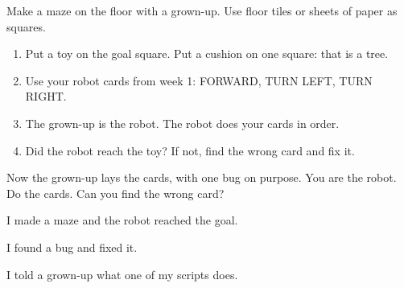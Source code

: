 
\begin{playathome}
Make a maze on the floor with a grown-up. Use floor tiles or sheets of paper as squares.
\begin{enumerate}[leftmargin=1.4em,itemsep=2pt]
  \item Put a toy on the goal square. Put a cushion on one square: that is a tree.
  \item Use your robot cards from week 1: FORWARD, TURN LEFT, TURN RIGHT.
  \item The grown-up is the robot. The robot does your cards in order.
  \item Did the robot reach the toy? If not, find the wrong card and fix it.
\end{enumerate}
\end{playathome}

\begin{playathome}
Now the grown-up lays the cards, with one bug on purpose. You are the robot. Do the cards. Can you find the wrong card?
\end{playathome}

\begin{selfcheck}
  \item I made a maze and the robot reached the goal.
  \item I found a bug and fixed it.
  \item I told a grown-up what one of my scripts does.
\end{selfcheck}
